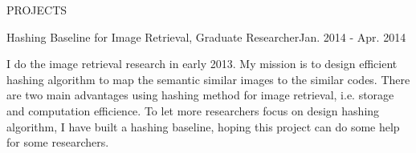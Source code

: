 \documentclass{resume} %
\begin{document}
\begin{rSection}{PROJECTS}
\begin{rSubsection}{Hashing Baseline for Image Retrieval, Graduate Researcher}{Jan. 2014 - Apr. 2014}{}{}
\item I do the image retrieval research in early 2013. My mission is to design efficient hashing algorithm to map the semantic similar images to the similar codes. There are two main advantages using hashing method for image retrieval, i.e. storage and computation efficience. To let more researchers focus on design hashing algorithm, I have built a hashing baseline, hoping this project can do some help for some researchers.
\end{rSubsection}
\end{rSection}



\end{document}
